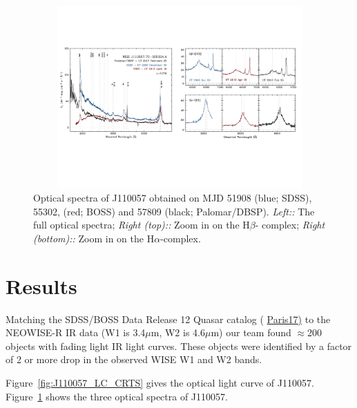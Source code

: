 \documentclass{nature}
\begin{document}
\begin{figure}
  \includegraphics[width=16.00cm, height=7.00cm, trim=0.0cm 0.0cm 0.0cm 0.0cm, clip]
  {../plots/spectra/J110057_spectra_wBalmers.pdf}
  \centering
  \caption[]{
Optical spectra of J110057 obtained on MJD 51908 (blue; SDSS), 55302,
(red; BOSS) and 57809 (black; Palomar/DBSP).  {\it Left::} The full
optical spectra; {\it Right (top)::} Zoom in on the H$\beta$-\oiii
complex; {\it Right (bottom)::} Zoom in on the H$\alpha$-\nii complex.
}
  \label{fig:J110057_spectra}
\end{figure}
\section{Results}  
Matching the SDSS/BOSS Data Release 12 Quasar catalog ( \href{DR12Q;
}{Paris17)} to the NEOWISE-R IR data (W1 is 3.4$\mu$m, W2 is
4.6$\mu$m) our team found $\approx$200 objects with fading light IR
light curves. These objects were identified by a factor of 2 or more
drop in the observed WISE W1 and W2 bands.

Figure~\ref{fig:J110057_LC_CRTS} gives the optical light curve of
J110057.  Figure~\ref{fig:J110057_spectra} shows the three optical
spectra of J110057. 
\end{document}
